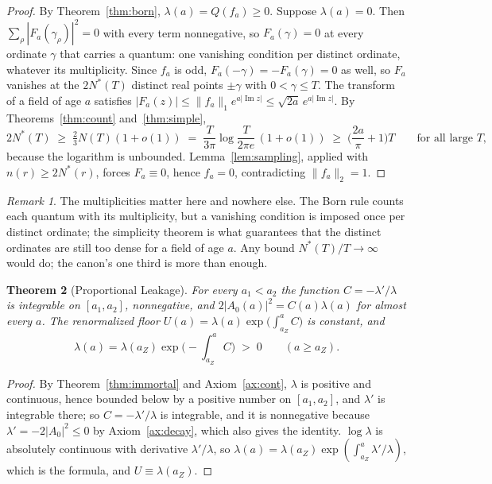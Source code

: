 \documentclass[11pt]{article}
\newtheorem{theorem}{Theorem}[section]
\theoremstyle{definition}
\theoremstyle{remark}
\newtheorem{remark}[theorem]{Remark}
\newcommand{\Imm}{\operatorname{Im}}
\begin{document}
\begin{proof}
By Theorem~\ref{thm:born}, $\lambda(a)=Q(f_a)\ge0$. Suppose $\lambda(a)=0$. Then $\sum_\rho|F_a(\gamma_\rho)|^2=0$ with every term nonnegative, so $F_a(\gamma)=0$ at every ordinate $\gamma$ that carries a quantum: one vanishing condition per distinct ordinate, whatever its multiplicity. Since $f_a$ is odd, $F_a(-\gamma)=-F_a(\gamma)=0$ as well, so $F_a$ vanishes at the $2N^*(T)$ distinct real points $\pm\gamma$ with $0<\gamma\le T$. The transform of a field of age $a$ satisfies $|F_a(z)|\le\|f_a\|_1e^{a|\Imm z|}\le\sqrt{2a}\,e^{a|\Imm z|}$. By Theorems~\ref{thm:count} and~\ref{thm:simple},
\[
2N^*(T)\;\ge\;\tfrac23N(T)(1+o(1))\;=\;\frac{T}{3\pi}\log\frac{T}{2\pi e}\,(1+o(1))\;\ge\;\Big(\frac{2a}{\pi}+1\Big)T\qquad\text{for all large }T,
\]
because the logarithm is unbounded. Lemma~\ref{lem:sampling}, applied with $n(r)\ge2N^*(r)$, forces $F_a\equiv0$, hence $f_a=0$, contradicting $\|f_a\|_2=1$.
\end{proof}

\begin{remark}
The multiplicities matter here and nowhere else. The Born rule counts each quantum with its multiplicity, but a vanishing condition is imposed once per distinct ordinate; the simplicity theorem is what guarantees that the distinct ordinates are still too dense for a field of age $a$. Any bound $N^*(T)/T\to\infty$ would do; the canon's one third is more than enough.
\end{remark}

\begin{theorem}[Proportional Leakage]\label{thm:leak}
For every $a_1<a_2$ the function $C=-\lambda'/\lambda$ is integrable on $[a_1,a_2]$, nonnegative, and $2|A_0(a)|^2=C(a)\lambda(a)$ for almost every $a$. The renormalized floor $U(a)=\lambda(a)\exp\big(\int_{a_Z}^aC\big)$ is constant, and
\[
\lambda(a)=\lambda(a_Z)\exp\Big(-\int_{a_Z}^aC\Big)\;>\;0\qquad(a\ge a_Z).
\]
\end{theorem}

\begin{proof}
By Theorem~\ref{thm:immortal} and Axiom~\ref{ax:cont}, $\lambda$ is positive and continuous, hence bounded below by a positive number on $[a_1,a_2]$, and $\lambda'$ is integrable there; so $C=-\lambda'/\lambda$ is integrable, and it is nonnegative because $\lambda'=-2|A_0|^2\le0$ by Axiom~\ref{ax:decay}, which also gives the identity. $\log\lambda$ is absolutely continuous with derivative $\lambda'/\lambda$, so $\lambda(a)=\lambda(a_Z)\exp(\int_{a_Z}^a\lambda'/\lambda)$, which is the formula, and $U\equiv\lambda(a_Z)$.
\end{proof}
\end{document}
